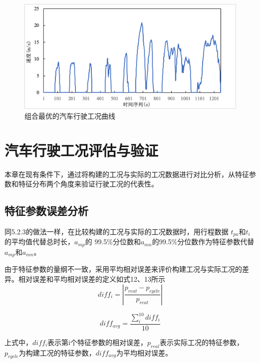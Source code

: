 \documentclass[bwprint]{gmcmthesis}
\begin{document}
\begin{figure}[htbp] %
\centering
\includegraphics[width=0.9\linewidth,angle=0]{figures/final.png}
\caption{组合最优的汽车行驶工况曲线}
\label{f5}
\end{figure}
\section{汽车行驶工况评估与验证}
本章在现有条件下，通过将构建的工况与实际的工况数据进行对比分析，从特征参数和特征分布两个角度来验证行驶工况的代表性。
\subsection{特征参数误差分析}
同5.2.3的做法一样，在比较构建的工况与实际的工况数据时，用行程数据 $t_{pa}$和$ t_i$ 的平均值代替总时长，$a_{mp}$的 99.5\%分位数和$a_{mn}$的99.5\%分位数作为特征参数代替$a_{mp}$和$a_{mn}$。

由于特征参数的量纲不一致，采用平均相对误差来评价构建工况与实际工况的差异。相对误差和平均相对误差的定义如式12、13所示
\begin{equation}
diff_i=|\frac{p_{reat}-p_{cycle}}{p_{reat}}|
\end{equation}

\begin{equation}
diff_{avg}=\frac{\sum\limits^{10}_i diff_i}{10}
\end{equation}

上式中，$diff_i$表示第i个特征参数的相对误差，$p_{real}$表示实际工况的特征参数，$p_{cycle}$为构建工况的特征参数，$diff_{avg}$为平均相对误差。
\end{document}
